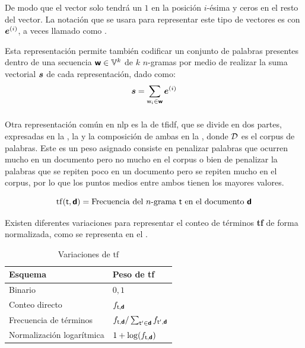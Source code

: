 De modo que el vector solo tendrá un $1$ en la posición $i$-ésima y ceros en el resto del vector. La notación que se usara para representar este tipo de vectores es con ${\bm{e}}^{(i)}$, a veces llamado como .

Esta representación permite también codificar un conjunto de palabras presentes dentro de una secuencia ${\bm{\mathit{\mathsf{w}}}}\in{\mathbb{V}}^{k}$ de $k$ $n$-gramas por medio de realizar la suma vectorial ${\bm{s}}$ de cada representación, dado como:
\begin{equation}
  {\bm{s}} = \sum_{{\mathit{\mathsf{w}}}_i\in{\bm{\mathit{\mathsf{w}}}}} {\bm{e}}^{(i)}
\end{equation}

\subsubsection{}
Otra representación común en \gls{nlp} es la de \gls{tfidf}, que se divide en dos partes, expresadas en la , la  y la composición de ambas en la , donde $\mathcal{D}$ es el \gls{corpus} de palabras. Este es un peso asignado consiste en penalizar palabras que ocurren mucho en un documento pero no mucho en el \gls{corpus} o bien de penalizar la palabras que se repiten poco en un documento pero se repiten mucho en el \gls{corpus}, por lo que los puntos medios entre ambos tienen los mayores valores.

\begin{equation} \label{eq:tf-repr}
  \mathrm{tf}({\mathit{\mathsf{t}}}, {\bm{\mathit{\mathsf{d}}}}) = \text{Frecuencia del $n$-grama ${\mathit{\mathsf{t}}}$ en el documento ${\bm{\mathit{\mathsf{d}}}}$}
\end{equation}

Existen diferentes variaciones para representar el conteo de términos \textbf{tf} de forma normalizada, como se representa en el .

\begin{table}[h!]
\centering
\begin{tabular}{|l|l|} \hline
  \textbf{Esquema}          & \textbf{Peso de tf} \\ \hline
  Binario                   & $0, 1$ \\ \hline
  Conteo directo            & $f_{{\mathit{\mathsf{t}}}, {\bm{\mathit{\mathsf{d}}}}}$ \\ \hline
  Frecuencia de términos    & $f_{{\mathit{\mathsf{t}}}, {\bm{\mathit{\mathsf{d}}}}} / \sum_{{\mathit{\mathsf{t}}}' \in {\bm{\mathit{\mathsf{d}}}}}f_{{\mathit{\mathsf{t}}}', {\bm{\mathit{\mathsf{d}}}}}$ \\ \hline
  Normalización logarítmica & $1 + \log(f_{{\mathit{\mathsf{t}}}, {\bm{\mathit{\mathsf{d}}}}})$ \\ \hline
\end{tabular}
\caption{Variaciones de $\mathrm{tf}$}
\label{table:tf}
\end{table}

